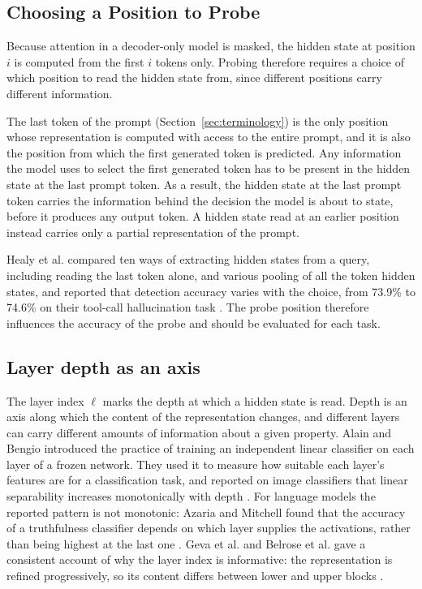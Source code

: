 \subsection{Choosing a Position to Probe}
\label{subsec:last-token}

Because attention in a decoder-only model is masked, the hidden state at position $i$ is computed from the first $i$ tokens only. Probing therefore requires a choice of which position to read the hidden state from, since different positions carry different information.

The last token of the prompt (Section~\ref{sec:terminology}) is the only position whose representation is computed with access to the entire prompt, and it is also the position from which the first generated token is predicted. Any information the model uses to select the first generated token has to be present in the hidden state at the last prompt token. As a result, the hidden state at the last prompt token carries the information behind the decision the model is about to state, before it produces any output token. A hidden state read at an earlier position instead carries only a partial representation of the prompt.

Healy et al. compared ten ways of extracting hidden states from a query, including reading the last token alone, and various pooling of all the token hidden states, and reported that detection accuracy varies with the choice, from 73.9\% to 74.6\% on their tool-call hallucination task \cite{healyInternalRepresentationsIndicators2026}. The probe position therefore influences the accuracy of the probe and should be evaluated for each task.

\subsection{Layer depth as an axis}
\label{subsec:layer-depth}

The layer index $\ell$ marks the depth at which a hidden state is read. Depth is an axis along which the content of the representation changes, and different layers can carry different amounts of information about a given property. Alain and Bengio introduced the practice of training an independent linear classifier on each layer of a frozen network. They used it to measure how suitable each layer's features are for a classification task, and reported on image classifiers that linear separability increases monotonically with depth \cite{alainUnderstandingIntermediateLayers2018a}. For language models the reported pattern is not monotonic: Azaria and Mitchell found that the accuracy of a truthfulness classifier depends on which layer supplies the activations, rather than being highest at the last one \cite{azariaInternalStateLLM2023}. Geva et al. and Belrose et al. gave a consistent account of why the layer index is informative: the representation is refined progressively, so its content differs between lower and upper blocks \cite{gevaTransformerFeedForwardLayers2021, belroseElicitingLatentPredictions2025}.

